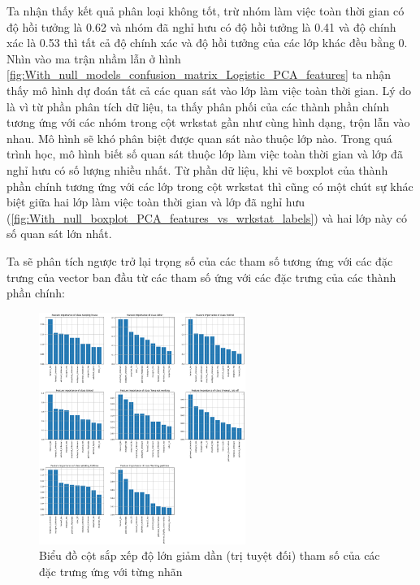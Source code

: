 \begin{enumerate}[label=(\alph*)]
    Ta nhận thấy kết quả phân loại không tốt, trừ nhóm làm việc toàn thời gian có độ hồi tưởng là 0.62 và nhóm đã nghỉ hưu có độ hồi tưởng là 0.41 và độ chính xác là 0.53 thì tất cả độ chính xác và độ hồi tưởng của các lớp khác đều bằng 0.
    Nhìn vào ma trận nhầm lẫn ở hình \ref{fig:With_null_models_confusion_matrix_Logistic_PCA_features} ta nhận thấy mô hình dự đoán tất cả các quan sát vào lớp làm việc toàn thời gian.
    Lý do là vì từ phần phân tích dữ liệu, ta thấy phân phối của các thành phần chính tương ứng với các nhóm trong cột wrkstat gần như cùng hình dạng, trộn lẫn vào nhau.
    Mô hình sẽ khó phân biệt được quan sát nào thuộc lớp nào.
    Trong quá trình học, mô hình biết số quan sát thuộc lớp làm việc toàn thời gian và lớp đã nghỉ hưu có số lượng nhiều nhất.
    Từ phần dữ liệu, khi vẽ boxplot của thành phần chính tương ứng với các lớp trong cột wrkstat thì cũng có một chút sự khác biệt giữa hai lớp làm việc toàn thời gian và lớp đã nghỉ hưu (\ref{fig:With_null_boxplot_PCA_features_vs_wrkstat_labels}) và hai lớp này có số quan sát lớn nhất.

    Ta sẽ phân tích ngược trở lại trọng số của các tham số tương ứng với các đặc trưng của vector ban đầu từ các tham số ứng với các đặc trưng của các thành phần chính:

    \begin{figure}[H]
        \centering
        \includegraphics[width=0.6\textwidth]{figures/Thanh/Models/Logistic/With_null_models_Feature_Importance_Logistic_PCA_features.png}
        \caption{Biểu đồ cột sắp xếp độ lớn giảm dần (trị tuyệt đối) tham số của các đặc trưng ứng với từng nhãn}
        \label{fig:With_null_models_Feature_Importance_Logistic_PCA_features}
    \end{figure}


\end{enumerate}
